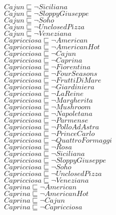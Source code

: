 \documentclass[a4paper,10pt]{article}
\begin{document}
 $Cajun \sqsubseteq  \lnot Siciliana$\\ 
 $Cajun \sqsubseteq  \lnot SloppyGiuseppe$\\ 
 $Cajun \sqsubseteq  \lnot Soho$\\ 
 $Cajun \sqsubseteq  \lnot UnclosedPizza$\\ 
 $Cajun \sqsubseteq  \lnot Veneziana$\\ 
 $Capricciosa \sqsubseteq  \lnot American$\\ 
 $Capricciosa \sqsubseteq  \lnot AmericanHot$\\ 
 $Capricciosa \sqsubseteq  \lnot Cajun$\\ 
 $Capricciosa \sqsubseteq  \lnot Caprina$\\ 
 $Capricciosa \sqsubseteq  \lnot Fiorentina$\\ 
 $Capricciosa \sqsubseteq  \lnot FourSeasons$\\ 
 $Capricciosa \sqsubseteq  \lnot FruttiDiMare$\\ 
 $Capricciosa \sqsubseteq  \lnot Giardiniera$\\ 
 $Capricciosa \sqsubseteq  \lnot LaReine$\\ 
 $Capricciosa \sqsubseteq  \lnot Margherita$\\ 
 $Capricciosa \sqsubseteq  \lnot Mushroom$\\ 
 $Capricciosa \sqsubseteq  \lnot Napoletana$\\ 
 $Capricciosa \sqsubseteq  \lnot Parmense$\\ 
 $Capricciosa \sqsubseteq  \lnot PolloAdAstra$\\ 
 $Capricciosa \sqsubseteq  \lnot PrinceCarlo$\\ 
 $Capricciosa \sqsubseteq  \lnot QuattroFormaggi$\\ 
 $Capricciosa \sqsubseteq  \lnot Rosa$\\ 
 $Capricciosa \sqsubseteq  \lnot Siciliana$\\ 
 $Capricciosa \sqsubseteq  \lnot SloppyGiuseppe$\\ 
 $Capricciosa \sqsubseteq  \lnot Soho$\\ 
 $Capricciosa \sqsubseteq  \lnot UnclosedPizza$\\ 
 $Capricciosa \sqsubseteq  \lnot Veneziana$\\ 
 $Caprina \sqsubseteq  \lnot American$\\ 
 $Caprina \sqsubseteq  \lnot AmericanHot$\\ 
 $Caprina \sqsubseteq  \lnot Cajun$\\ 
 $Caprina \sqsubseteq  \lnot Capricciosa$\\ 
\end{document}
